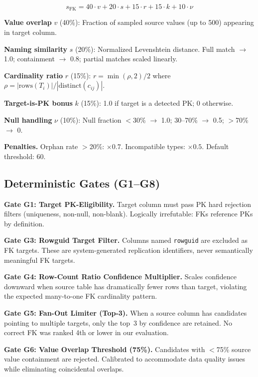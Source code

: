 \documentclass[twocolumn]{svjour3}
\begin{document}
\begin{equation}
s_{\mathrm{FK}} = 40 \cdot v + 20 \cdot s + 15 \cdot r + 15 \cdot k + 10 \cdot \nu
\end{equation}

\textbf{Value overlap} $v$ (40\%): Fraction of sampled source values (up to 500) appearing in target column.

\textbf{Naming similarity} $s$ (20\%): Normalized Levenshtein distance. Full match $\to$ 1.0; containment $\to$ 0.8; partial matches scaled linearly.

\textbf{Cardinality ratio} $r$ (15\%): $r = \min(\rho, 2) / 2$ where $\rho = |\mathrm{rows}(T_i)| / |\mathrm{distinct}(c_{ij})|$.

\textbf{Target-is-PK bonus} $k$ (15\%): 1.0 if target is a detected PK; 0 otherwise.

\textbf{Null handling} $\nu$ (10\%): Null fraction $<$30\% $\to$ 1.0; 30--70\% $\to$ 0.5; $>$70\% $\to$ 0.

\textbf{Penalties.} Orphan rate $>$20\%: $\times 0.7$. Incompatible types: $\times 0.5$. Default threshold: 60.

\subsection{Deterministic Gates (G1--G8)}

\textbf{Gate G1: Target PK-Eligibility.} Target column must pass PK hard rejection filters (uniqueness, non-null, non-blank). Logically irrefutable: FKs reference PKs by definition.

\textbf{Gate G3: Rowguid Target Filter.} Columns named \texttt{rowguid} are excluded as FK targets. These are system-generated replication identifiers, never semantically meaningful FK targets.

\textbf{Gate G4: Row-Count Ratio Confidence Multiplier.} Scales confidence downward when source table has dramatically fewer rows than target, violating the expected many-to-one FK cardinality pattern.

\textbf{Gate G5: Fan-Out Limiter (Top-3).} When a source column has candidates pointing to multiple targets, only the top~3 by confidence are retained. No correct FK was ranked 4th or lower in our evaluation.

\textbf{Gate G6: Value Overlap Threshold (75\%).} Candidates with $<$75\% source value containment are rejected. Calibrated to accommodate data quality issues while eliminating coincidental overlaps.
\end{document}
